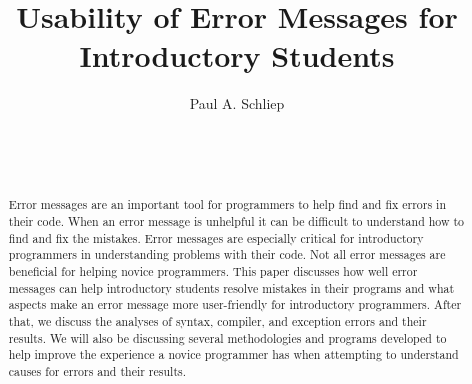\documentclass{sig-alternate}
\begin{document}

\title{Usability of Error Messages for Introductory Students}


\author{
\alignauthor
Paul A. Schliep\\
	\\
	\\
	\\
}

\maketitle
\begin{abstract}
Error messages are an important tool for programmers to help find and fix errors in their code. When an error message is unhelpful it can be difficult to understand how to find and fix the mistakes. Error messages are especially critical for introductory programmers in understanding problems with their code. Not all error messages are beneficial for helping novice programmers. This paper discusses how well error messages can help introductory students resolve mistakes in their programs and what aspects make an error message more user-friendly for introductory programmers. After that, we discuss the analyses of syntax, compiler, and exception errors and their results. We will also be discussing several methodologies and programs developed to help improve the experience a novice programmer has when attempting to understand causes for errors and their results.

\end{abstract}
\end{document}
